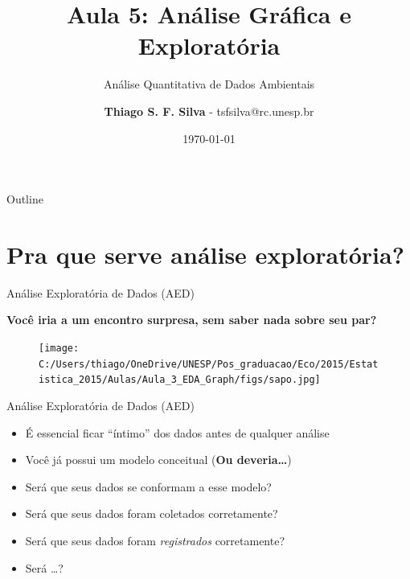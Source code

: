 \documentclass{beamer}\usepackage[]{graphicx}\usepackage[]{color}
\title{Aula 5: Análise Gráfica e Exploratória}
\subtitle{Análise Quantitativa de Dados Ambientais}
\author{\textbf{Thiago S. F. Silva} - tsfsilva@rc.unesp.br}
\institute{Programa de Pós Graduação em Geografia - IGCE/UNESP}
\date{\today}
\begin{document}
\begin{frame}[plain] %
  \titlepage
\end{frame}

\begin{frame}{Outline}
  \tableofcontents
\end{frame}

\section{Pra que serve análise exploratória?}


\begin{frame}{Análise Exploratória de Dados (AED)}
\centering

\large{\textbf{Você iria a um encontro surpresa, sem saber nada sobre seu par?}} \pause

\begin{figure}
\texttt{[image: C:/Users/thiago/OneDrive/UNESP/Pos\_graduacao/Eco/2015/Estatistica\_2015/Aulas/Aula\_3\_EDA\_Graph/figs/sapo.jpg]}
\end{figure}

\end{frame}


\begin{frame}{Análise Exploratória de Dados (AED)}
  
\begin{itemize}

\item  É essencial ficar ``íntimo'' dos dados antes de qualquer análise \pause
\item	Você já possui um modelo conceitual (\textbf{Ou deveria\ldots}) \pause
\item	Será que seus dados se conformam a esse modelo? \pause
\item Será que seus dados foram coletados corretamente? \pause
\item Será que seus dados foram \emph{registrados} corretamente? \pause
\item Será \ldots? 
\end{itemize}


\end{frame} 
\end{document}
